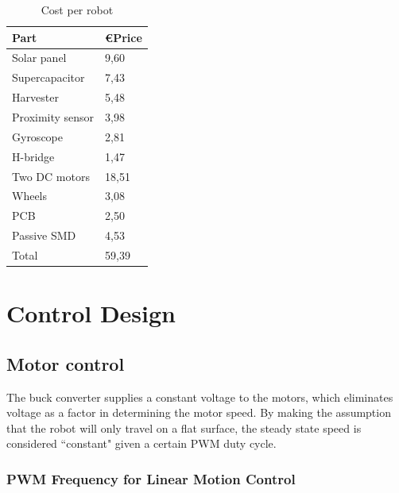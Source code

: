 \begin{table}[t]
	\centering
	\caption{Cost per robot}
	\label{tab:cost_robot}
	\begin{tabular}{|l|l|} 
		\hline
		Part & \euro Price \\
		\hline\hline
		Solar panel & 9,60\\
		Supercapacitor & 7,43\\
		Harvester & 5,48 \\
		Proximity sensor & 3,98 \\
		Gyroscope & 2,81\\	
		H-bridge & 1,47 \\
		Two DC motors & 18,51 \\
		Wheels & 3,08\\
		PCB & 2,50 \\
		Passive SMD & 4,53\\
		\hline \hline
		Total & 59,39 \\
		\hline
	\end{tabular}
\end{table}


\section{Control Design}

\subsection{Motor control}
\label{sec:motor_control}

The buck converter supplies a constant voltage to the motors, which eliminates voltage as a factor in determining the motor speed.
By making the assumption that the robot will only travel on a flat surface, the steady state speed is considered ``constant" given a certain PWM duty cycle.

\subsubsection{PWM Frequency for Linear Motion Control}

